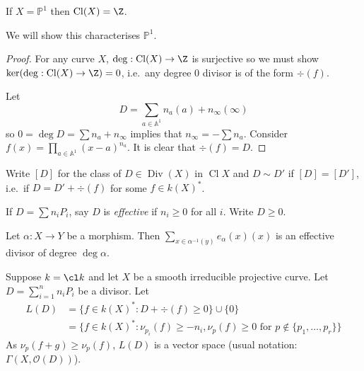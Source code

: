 \documentclass[a4paper]{article}
\renewcommand{\A}{\mathbb{A}}
\DeclareMathOperator{\Cl}{Cl}
\renewcommand*{\P}{\mathbb{P}}
\DeclareMathOperator{\Div}{Div} %
\begin{document}
\begin{proposition}
  If \(X = \P^1\) then \(\Cl (X) = \Z\).
\end{proposition}

\begin{remark}
  We will show this characterises \(\P^1\).
\end{remark}

\begin{proof}
  For any curve \(X\), \(\deg: \Cl(X) \to \Z\) is surjective so we must show \(\ker (\deg: \Cl(X) \to \Z) = 0\), i.e.\ any degree \(0\) divisor is of the form \(\div(f)\).

  Let
  \[
    D = \sum_{a \in \A^1} n_a (a) + n_\infty (\infty)
  \]
  so \(0 = \deg D = \sum n_a +n_\infty\) implies that \(n_\infty = -\sum n_a\). Consider \(f(x) = \prod_{a \in \A^1} (x - a)^{n_a}\). It is clear that \(\div (f) = D\).
\end{proof}

Write \([D]\) for the class of \(D \in \Div(X)\) in \(\Cl X\) and \(D \sim D'\) if \([D] = [D']\), i.e.\ if \(D = D' + \div (f)\) for some \(f \in k(X)^*\).

If \(D = \sum n_i P_i\), say \(D\) is \emph{effective} if \(n_i \geq 0\) for all \(i\). Write \(D \geq 0\).

\begin{eg}
  Let \(\alpha: X \to Y\) be a morphism. Then \(\sum_{x \in \alpha^{-1}(y)} e_\alpha(x) (x)\) is an effective divisor of degree \(\deg \alpha\).
\end{eg}

Suppose \(k = \cl k\) and let \(X\) be a smooth irreducible projective curve. Let \(D = \sum_{i = 1}^n n_i P_i\) be a divisor. Let
\begin{align*}
  L(D)
  &= \{f \in k(X)^*: D + \div (f) \geq 0\} \cup \{0\} \\
  &= \{f \in k(X)^*: \nu_{p_i}(f) \geq -n_i, \nu_p(f) \geq 0 \text{ for } p \notin \{p_1, \dots, p_r\}\}
\end{align*}
As \(\nu_p(f + g) \geq \nu_p(f)\), \(L(D)\) is a vector space (usual notation: \(\Gamma(X, \mathcal O(D))\)).

\begin{eg}\leavevmode
\end{eg}
\end{document}
